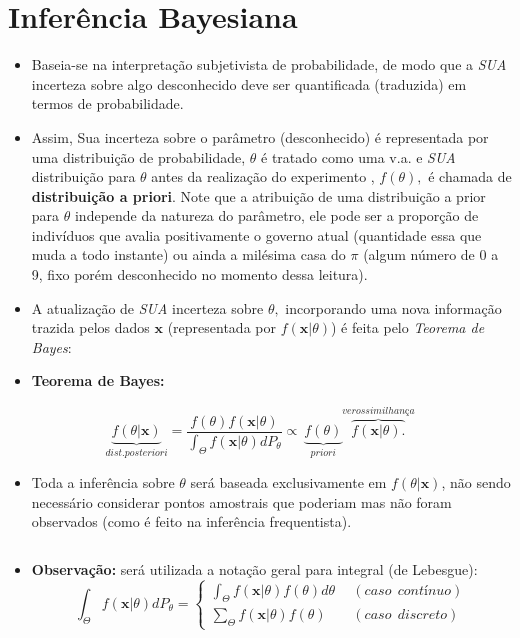 \documentclass[
]{book}
\providecommand{\tightlist}{%
  \setlength{\itemsep}{0pt}\setlength{\parskip}{0pt}}
\begin{document}
\hypertarget{inferuxeancia-bayesiana}{%
\section{Inferência Bayesiana}\label{inferuxeancia-bayesiana}}

\begin{itemize}
\item
  Baseia-se na interpretação subjetivista de probabilidade, de modo que a \emph{SUA} incerteza sobre algo desconhecido deve ser quantificada (traduzida) em termos de probabilidade.
\item
  Assim, Sua incerteza sobre o parâmetro (desconhecido) é representada por uma distribuição de probabilidade, \(\theta\) é tratado como uma v.a. e \emph{SUA} distribuição para \(\theta\) antes da realização do experimento , \(f(\theta),\) é chamada de \textbf{distribuição a priori}. Note que a atribuição de uma distribuição a prior para \(\theta\) independe da natureza do parâmetro, ele pode ser a proporção de indivíduos que avalia positivamente o governo atual (quantidade essa que muda a todo instante) ou ainda a milésima casa do \(\pi\) (algum número de 0 a 9, fixo porém desconhecido no momento dessa leitura).
\item
  A atualização de \emph{SUA} incerteza sobre \(\theta,\) incorporando uma nova informação trazida pelos dados \(\boldsymbol x\) (representada por \(f(\boldsymbol x| \theta)\)) é feita pelo \emph{Teorema de Bayes}:
\item
  \textbf{Teorema de Bayes:}
\end{itemize}

\[\underbrace{f(\theta| \boldsymbol x)}_{dist. posteriori}=\dfrac{f(\theta)f(\boldsymbol x|\theta)}{\displaystyle \int_{\Theta}f(\boldsymbol x|\theta)dP_\theta} \propto~ \underbrace{f(\theta)}_{priori}\overbrace{f(\boldsymbol x|\theta).}^{verossimilhança}\]

\begin{itemize}
\tightlist
\item
  Toda a inferência sobre \(\theta\) será baseada exclusivamente em \(f(\theta| \boldsymbol x)\), não sendo necessário considerar pontos amostrais que poderiam mas não foram observados (como é feito na inferência frequentista).
\end{itemize}

\(~\)

\begin{itemize}
\tightlist
\item
  \textbf{Observação:} será utilizada a notação geral para integral (de Lebesgue): \[\displaystyle \int_{\Theta}f(\boldsymbol x|\theta)dP_\theta
  = \left\{ \begin{array}{ll} \displaystyle \int_{\Theta}f(\boldsymbol x|\theta) f(\theta) d\theta ~&~ (caso~~contínuo)\\
  \displaystyle \sum_{\Theta}f(\boldsymbol x|\theta) f(\theta) ~&~ (caso~~discreto) \end{array}\right.\]
\end{itemize}
\end{document}
